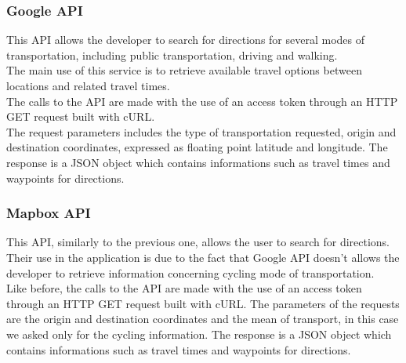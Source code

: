 \subsubsection*{Google API}
This API allows the developer to search for directions for several modes of transportation, including public transportation, driving and walking.\\
The main use of this service is to retrieve available travel options between locations and related travel times.\\
The calls to the API are made with the use of an access token through an HTTP GET request built with cURL.\\
The request parameters includes the type of transportation requested, origin and destination coordinates, expressed as floating point latitude and longitude. The response is a JSON object which contains informations such as travel times and waypoints for directions.

\subsubsection*{Mapbox API}
This API, similarly to the previous one, allows the user to search for directions.\\
Their use in the application is due to the fact that Google API doesn't allows the developer to retrieve information concerning cycling mode of transportation.\\ 
Like before, the calls to the API are made with the use of an access token through an HTTP GET request built with cURL. The parameters of the requests are the origin and destination coordinates and the mean of transport, in this case we asked only for the cycling information. The response is a JSON object which contains informations such as travel times and waypoints for directions.

